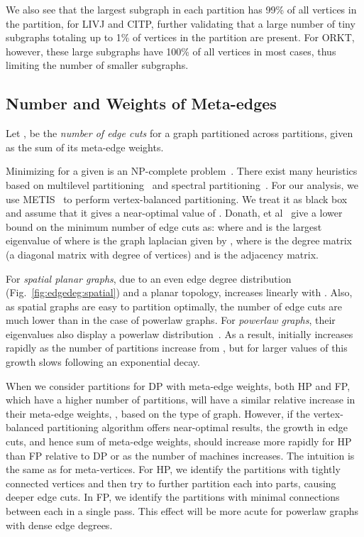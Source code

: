 \documentclass[10pt,conference, compsocconf]{IEEEtran}
\begin{document}
We also see that the largest subgraph in each partition has 99\% of all vertices in the partition, for LIVJ and CITP, further validating that a large number of tiny subgraphs totaling up to 1\% of vertices in the partition are present. For ORKT, however, these large subgraphs have 100\% of all vertices in most cases, thus limiting the number of smaller subgraphs.



\subsection{Number and Weights of Meta-edges}
Let  , be the \emph{number of edge cuts} for a graph  partitioned across  partitions, given as the sum of its meta-edge weights. 

Minimizing  for a given  is an NP-complete problem~\cite{garey1974some}. There exist many heuristics based on multilevel partitioning~\cite{multilevel-part,metis} and spectral partitioning~\cite{spectral-part}. For our analysis, we use METIS~\cite{metis} to perform vertex-balanced partitioning. We treat it as black box and assume that it gives a near-optimal value of .
Donath, et al~\cite{donath} give a lower bound on the minimum number of edge cuts as:
 where  and  is the  largest eigenvalue of  where  is the graph laplacian given by , where  is the degree matrix (a diagonal matrix with degree of vertices) and  is the adjacency matrix.

For \emph{spatial planar graphs}, due to an even edge degree distribution (Fig.~\ref{fig:edgedeg:spatial}) and a planar topology,  increases linearly with . Also, as spatial graphs are easy to partition optimally, the number of edge cuts are much lower than in the case of powerlaw graphs. 
For \emph{powerlaw graphs}, their eigenvalues also display a powerlaw distribution~\cite{eigenpower}. As a result,  initially increases rapidly as the number of partitions increase from , but for larger values of  this growth slows following an exponential decay. 

When we consider  partitions for DP with  meta-edge weights, both HP and FP, which have a higher number of  partitions, will have a similar relative increase in their meta-edge weights, , based on the type of graph. However, if the vertex-balanced partitioning algorithm offers near-optimal results, the growth in edge cuts, and hence sum of meta-edge weights, should increase more rapidly for HP than FP relative to DP or as the number of machines increases. The intuition is the same as for meta-vertices. For HP, we identify the  partitions with tightly connected vertices and then try to further partition each into  parts, causing deeper edge cuts. In FP, we identify the  partitions with minimal connections between each in a single pass. This effect will be more acute for powerlaw graphs with dense edge degrees. 
\end{document}
